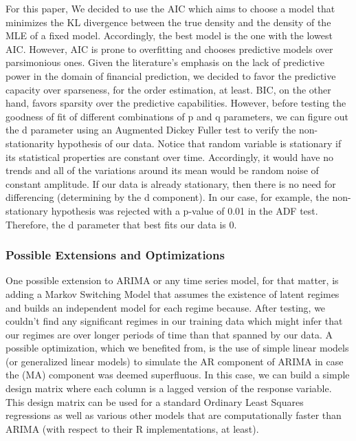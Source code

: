 For this paper, We decided to use the AIC which aims to choose a model that minimizes the KL divergence between the true density and the density of the MLE of a fixed model. Accordingly, the best model is the one with the lowest AIC. However, AIC is prone to overfitting and chooses predictive models over parsimonious ones. Given the literature's emphasis on the lack of predictive power in the domain of financial prediction, we decided to favor the predictive capacity over sparseness, for the order estimation, at least. BIC, on the other hand, favors sparsity over the predictive capabilities.
However, before testing the goodness of fit of different combinations of p and q parameters, we can figure out the d parameter using an Augmented Dickey Fuller test to verify the non-stationarity hypothesis of our data. Notice that random variable is stationary if its statistical properties are constant over time. Accordingly, it would have no trends and all of the variations around its mean would be random noise of constant amplitude. \cite{tsay, VAR}
If our data is already stationary, then there is no need for differencing (determining by the d component). In our case, for example, the non-stationary hypothesis was rejected with a p-value of 0.01 in the ADF test. Therefore, the d parameter that best fits our data is 0.
\subsubsection{Possible Extensions and Optimizations}
One possible extension to ARIMA or any time series model, for that matter, is adding a Markov Switching Model that assumes the existence of latent regimes and builds an independent model for each regime because.\cite{MS} After testing, we couldn't find any significant regimes in our training data which might infer that our regimes are over longer periods of time than that spanned by our data.
A possible optimization, which we benefited from, is the use of simple linear models (or generalized linear models) to simulate the AR component of ARIMA in case the (MA) component was deemed superfluous. In this case, we can build a simple design matrix where each column is a lagged version of the response variable. This design matrix can be used for a standard Ordinary Least Squares regressions as well as various other models that are computationally faster than ARIMA (with respect to their R implementations, at least).
